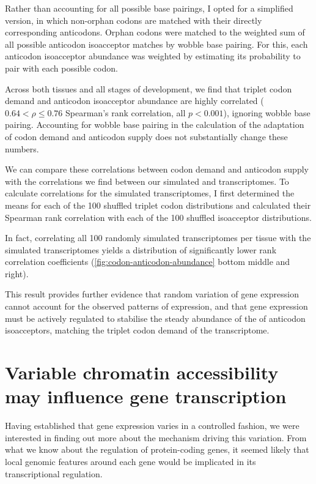 Rather than accounting for all possible base pairings, I opted for a simplified
version, in which non-orphan codons are matched with their directly
corresponding anticodons. Orphan codons were matched to the weighted sum of all
possible \trna anticodon isoacceptor matches by wobble base pairing. For this,
each anticodon isoacceptor abundance was weighted by estimating its probability
to pair with each possible codon.

Across both tissues and all stages of development, we find that \mrna triplet
codon demand and \trna anticodon isoacceptor abundance are highly correlated
(\(0.64 < \rho \leq 0.76\) Spearman’s rank correlation, all \(p < 0.001\)),
ignoring wobble base pairing. Accounting for wobble base pairing in the
calculation of the adaptation of codon demand and anticodon supply does not
substantially change these numbers.

We can compare these correlations between \mrna codon demand and \trna anticodon
supply with the correlations we find between our simulated \mrna and \trna
transcriptomes. To calculate correlations for the simulated transcriptomes, I
first determined the means for each of the \num{100} shuffled triplet codon
distributions and calculated their Spearman rank correlation with each of the
\num{100} shuffled isoacceptor distributions.

In fact, correlating all \num{100} randomly simulated \trna
transcriptomes per tissue with the simulated \mrna transcriptomes yields a
distribution of significantly lower rank correlation coefficients
(\cref{fig:codon-anticodon-abundance} bottom middle and right).

This result provides further evidence that random variation of \trna gene
expression cannot account for the observed patterns of expression, and that
\trna gene expression must be actively regulated to stabilise the steady
abundance of the of \trna anticodon isoacceptors, matching the triplet codon
demand of the \mrna transcriptome.

\section{Variable chromatin accessibility may influence  gene
transcription}

Having established that \trna gene expression varies in a controlled fashion, we
were interested in finding out more about the mechanism driving this variation.
From what we know about the regulation of protein-coding genes, it seemed likely
that local genomic features around each \trna gene would be implicated in its
transcriptional regulation.

